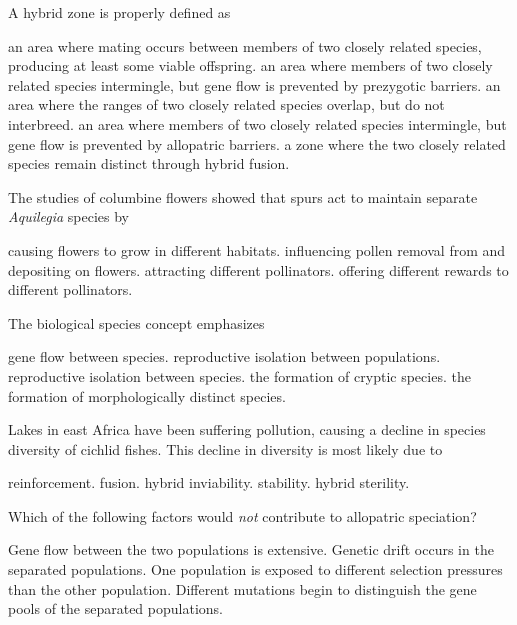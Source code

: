 
\question
A hybrid zone is properly defined as 

\begin{choices}
\correctchoice an area where mating occurs between members of two closely related species, producing at least some viable offspring. 
\choice an area where members of two closely related species intermingle, but gene flow is prevented by prezygotic barriers. 
\choice an area where the ranges of two closely related species overlap, but do not interbreed. 
\choice an area where members of two closely related species intermingle, but gene flow is prevented by allopatric barriers. 
\choice a zone where the two closely related species remain distinct through hybrid fusion. 
\end{choices}

\question
The studies of columbine flowers showed that spurs act to maintain separate \textit{Aquilegia} species by

\begin{choices}
\choice causing flowers to grow in different habitats. 
\correctchoice influencing pollen removal from and depositing on flowers. 
\choice attracting different pollinators. 
\choice offering different rewards to different pollinators. 
\end{choices}

\question
The biological species concept emphasizes

\begin{choices}
\choice gene flow between species.
\choice reproductive isolation between populations.
\correctchoice reproductive isolation between species.
\choice the formation of cryptic species.
\choice the formation of morphologically distinct species.
\end{choices}

\question
Lakes in east Africa have been suffering pollution, causing a decline in species diversity of cichlid fishes. This decline in diversity is most likely due to

\begin{choices}
\choice reinforcement. 
\correctchoice fusion. 
\choice hybrid inviability. 
\choice stability. 
\choice hybrid sterility. 
\end{choices}

\question
Which of the following factors would \emph{not} contribute to allopatric speciation?

\begin{choices}
	\correctchoice Gene flow between the two populations is extensive.   
	\choice Genetic drift occurs in the separated populations.   
	\choice One population is exposed to different selection pressures than the other population.   
	\choice Different mutations begin to distinguish the gene pools of the separated populations.   
\end{choices}

